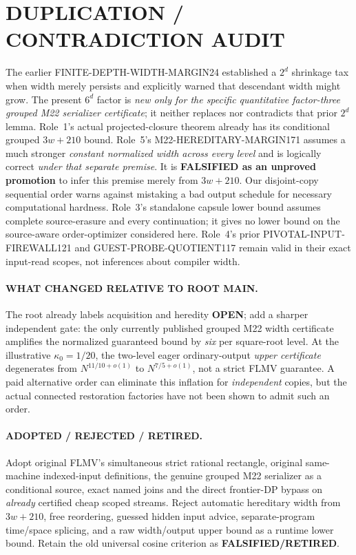 \documentclass[11pt]{article}
\newcommand{\OPEN}{\textbf{OPEN}}
\begin{document}
\section{DUPLICATION / CONTRADICTION AUDIT}
The earlier FINITE-DEPTH-WIDTH-MARGIN24 established
a $2^d$ shrinkage tax when width merely persists
and explicitly warned that descendant width might grow.
The present $6^d$ factor is \emph{new only for the
specific quantitative factor-three grouped
M22 serializer certificate}; it neither replaces nor
contradicts that prior $2^d$ lemma.
Role~1's actual projected-closure theorem
already has its conditional grouped $3w+210$
bound. Role~5's M22-HEREDITARY-MARGIN171
assumes a much stronger \emph{constant normalized
width across every level} and is logically
correct \emph{under that separate premise}.
It is \textbf{FALSIFIED as an unproved promotion}
to infer this premise merely from $3w+210$.
Our disjoint-copy sequential order warns against
mistaking a bad output schedule for necessary
computational hardness.
Role~3's standalone capsule lower bound assumes
complete source-erasure and every continuation;
it gives no lower bound on the
source-aware order-optimizer considered here.
Role~4's prior PIVOTAL-INPUT-FIREWALL121
and GUEST-PROBE-QUOTIENT117 remain valid in
their exact input-read scopes, not inferences
about compiler width.

\paragraph{WHAT CHANGED RELATIVE TO ROOT MAIN.}
The root already labels acquisition and
heredity \OPEN{}; add a sharper independent gate:
the only currently published grouped M22 width
certificate amplifies the normalized guaranteed
bound by \emph{six} per square-root level.
At the illustrative $\kappa_0=1/20$,
the two-level eager ordinary-output
\emph{upper certificate} degenerates from
$N^{11/10+o(1)}$ to $N^{7/5+o(1)}$,
not a strict FLMV guarantee.
A paid alternative order can eliminate this
inflation for \emph{independent} copies,
but the actual connected restoration factories
have not been shown to admit such an order.

\paragraph{ADOPTED / REJECTED / RETIRED.}
Adopt original FLMV's simultaneous strict rational
rectangle, original same-machine indexed-input
definitions, the genuine grouped M22 serializer
as a conditional source, exact named joins and
the direct frontier-DP bypass on \emph{already}
certified cheap scoped streams.
Reject automatic hereditary width from
$3w+210$, free reordering, guessed hidden
input advice, separate-program time/space
splicing, and a raw width/output upper bound
as a runtime lower bound.
Retain the old universal cosine
criterion as \textbf{FALSIFIED/RETIRED}.
\end{document}
